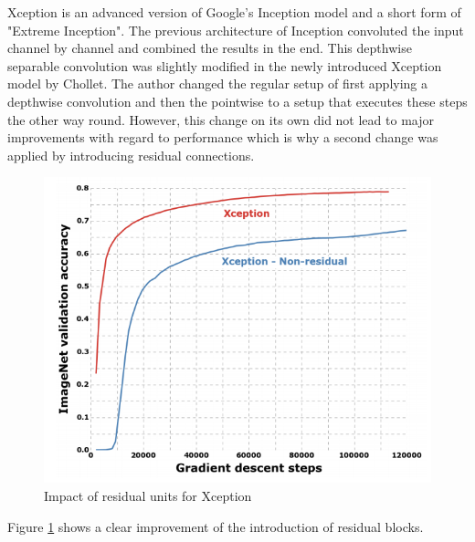 Xception is an advanced version of Google's Inception model and a short form of "Extreme Inception". The previous architecture of Inception convoluted the input channel by channel and combined the results in the end. This depthwise separable convolution was slightly modified in the newly introduced Xception model by Chollet\cite{chollet2017xception}. The author changed the regular setup of first applying a depthwise convolution and then the pointwise to a setup that executes these steps the other way round. However, this change on its own did not lead to major improvements with regard to performance which is why a second change was applied by introducing residual connections\cite{chollet2017xception}.
\begin{figure}[ht]
  \centering
  \includegraphics[width=\linewidth]{figures/xception_residuals.png}
  \caption{Impact of residual units for Xception\cite{chollet2017xception}}
  \label{xception_residuals}
\end{figure}

Figure \ref{xception_residuals} shows a clear improvement of the introduction of residual blocks.

